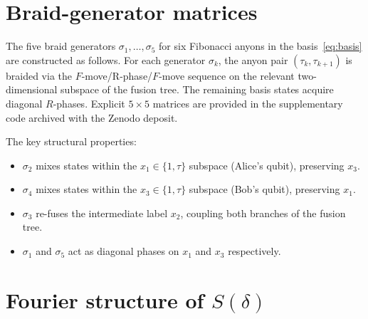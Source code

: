 \documentclass[aps,pra,twocolumn,superscriptaddress,longbibliography,floatfix,nofootinbib]{revtex4-2}
\begin{document}
\appendix

\section{Braid-generator matrices}
\label{app:generators}

The five braid generators $\sigma_1,\ldots,\sigma_5$ for six
Fibonacci anyons in the basis~\eqref{eq:basis} are constructed
as follows.
For each generator $\sigma_k$, the anyon pair $(\tau_k,\tau_{k+1})$
is braided via the $F$-move/R-phase/$F$-move sequence on the
relevant two-dimensional subspace of the fusion tree.
The remaining basis states acquire diagonal $R$-phases.
Explicit $5\times 5$ matrices are provided in the supplementary
code archived with the Zenodo deposit.

The key structural properties:
\begin{itemize}
\item $\sigma_2$ mixes states within the $x_1\in\{1,\tau\}$
subspace (Alice's qubit), preserving $x_3$.
\item $\sigma_4$ mixes states within the $x_3\in\{1,\tau\}$
subspace (Bob's qubit), preserving $x_1$.
\item $\sigma_3$ re-fuses the intermediate label $x_2$, coupling
both branches of the fusion tree.
\item $\sigma_1$ and $\sigma_5$ act as diagonal phases on $x_1$
and $x_3$ respectively.
\end{itemize}

\section{Fourier structure of $S(\delta)$}
\label{app:fourier}
\end{document}
